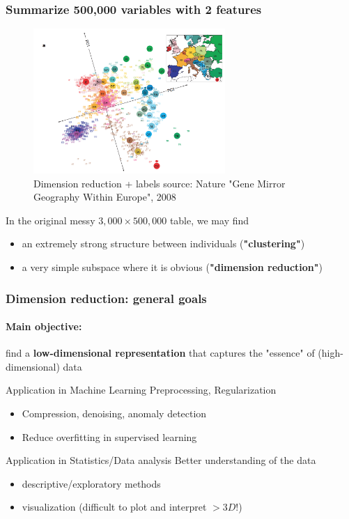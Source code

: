 \documentclass{beamer}\usepackage[]{graphicx}\usepackage[]{color}
\begin{document}
\begin{frame}
  \frametitle{Summarize 500,000 variables with 2 features}

  \begin{figure}
    \centering
      \includegraphics[height=5.5cm]{geneMirrorGeography}
    \caption{Dimension reduction + labels {\tiny source: Nature "Gene  Mirror Geography Within  Europe", 2008}}
  \end{figure}

  In the original messy $3,000 \times 500,000$ table, we may find
  \begin{itemize}
    \item an extremely strong structure between individuals (\alert{\bf "clustering"})
    \item a very simple subspace where it is obvious (\alert{\bf "dimension reduction"})
  \end{itemize}

\end{frame}

\begin{frame}[label=DimensionReduction]
  \frametitle{Dimension reduction: general goals}

  \paragraph{Main objective:} find a \alert{\bf low-dimensional representation} that captures the "essence" of (high-dimensional) data

  \vfill

  \begin{block}{Application in Machine Learning}
  \alert{Preprocessing, Regularization}
  \begin{itemize}
    \item Compression, denoising,  anomaly detection
    \item Reduce overfitting in supervised learning
  \end{itemize}
  \end{block}

\vfill

  \begin{block}{Application in Statistics/Data analysis}
    \alert{Better understanding of the data}
    \begin{itemize}
      \item descriptive/exploratory methods
      \item visualization (difficult to plot and interpret $> 3D$!)
    \end{itemize}
  \end{block}

\end{frame}
\end{document}
